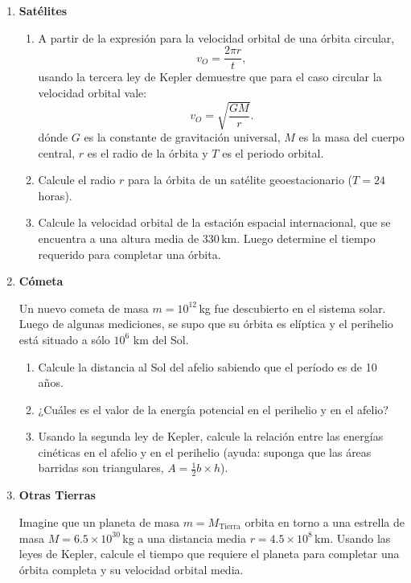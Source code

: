 \documentclass[a4paper,12pt]{article}
\begin{document}
\begin{enumerate}
\item {\bf{Satélites}}

	\begin{enumerate}
		\item A partir de la expresión para la velocidad orbital de una órbita
			circular, \[v_O = \frac{2 \pi r}{t},\] usando la tercera ley de
			Kepler demuestre que para el caso circular la velocidad orbital
			vale: \[v_O = \sqrt{\frac{GM}{r}}. \] dónde $G$ es la constante de
			gravitación universal, $M$ es la masa del cuerpo central, $r$ es el
			radio de la órbita y $T$ es el periodo orbital.
		\item Calcule el radio $r$ para la órbita de un satélite
			geoestacionario ($T=24$\,horas).
		\item Calcule la velocidad orbital de la estación espacial
			internacional, que se encuentra a una altura media de $330$\,km.
			Luego determine el tiempo requerido para completar una órbita.
	\end{enumerate}

\item {\bf{Cómeta}}
	
	Un nuevo cometa de masa $m=10^{12}$\,kg fue descubierto en el sistema
	solar.  Luego de algunas mediciones, se supo que su órbita es elíptica y el
	perihelio está situado a sólo $10^6$ km del Sol.

\begin{enumerate}
	\item Calcule la distancia al Sol del afelio sabiendo que el período es de
		10 años.
	\item ¿Cuáles es el valor de la energía potencial en el perihelio y en el
		afelio?
	\item Usando la segunda ley de Kepler, calcule la relación entre las
		energías cinéticas en el afelio y en el perihelio (ayuda: suponga que
		las áreas barridas son triangulares, $A=\frac{1}{2} b \times h$).
\end{enumerate}

\item {\bf{Otras Tierras}}

	Imagine que un planeta de masa $m=M_\mathrm{Tierra}$ orbita en torno a una
	estrella de masa $M=6.5 \times 10^{30}$\,kg a una distancia media
	$r=4.5\times10^8$\,km. Usando las leyes de Kepler, calcule el tiempo que
	requiere el planeta para completar una órbita completa y su velocidad
	orbital media.

\end{enumerate}
\end{document}
